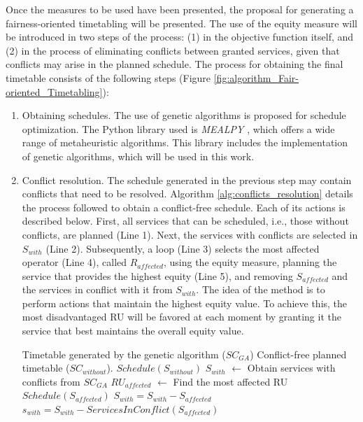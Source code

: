 \documentclass[preprint,12pt]{elsarticle}
\begin{document}
Once the measures to be used have been presented, the proposal for generating a fairness-oriented timetabling will be presented. The use of the equity measure will be introduced in two steps of the process: (1) in the objective function itself, and (2) in the process of eliminating conflicts between granted services, given that conflicts may arise in the planned schedule. The process for obtaining the final timetable consists of the following steps (Figure \ref{fig:algorithm_Fair-oriented_Timetabling}):
\begin{enumerate}


    \item Obtaining schedules. The use of genetic algorithms is proposed \cite{Holland1992} for schedule optimization. The Python library used is \textit{MEALPY} \cite{Vanthieu2023}, which offers a wide range of metaheuristic algorithms. This library includes the implementation of genetic algorithms, which will be used in this work.  
    \item Conflict resolution. The schedule generated in the previous step may contain conflicts that need to be resolved. Algorithm \ref{alg:conflicts_resolution} details the process followed to obtain a conflict-free schedule. Each of its actions is described below. First, all services that can be scheduled, i.e., those without conflicts, are planned (Line 1). Next, the services with conflicts are selected in $S_{with}$ (Line 2). Subsequently, a loop (Line 3) selects the most affected operator (Line 4), called $R_{affected}$, using the equity measure, planning the service that provides the highest equity (Line 5), and removing $S_{affected}$ and the services in conflict with it from $S_{with}$. The idea of the method is to perform actions that maintain the highest equity value. To achieve this, the most disadvantaged RU will be favored at each moment by granting it the service that best maintains the overall equity value.

\begin{algorithm}[!t]
\caption{Resolution of scheduling conflicts returned by the genetic algorithm.}
\label{alg:conflicts_resolution}
\begin{algorithmic}[1]
\REQUIRE Timetable generated by the genetic algorithm ($SC_{GA}$)
\ENSURE Conflict-free planned timetable ($SC_{without}$).
\STATE $Schedule(S_{without})$ 
\STATE $S_{with}$ $\leftarrow$ Obtain services with conflicts from $SC_{GA}$
    \STATE $RU_{affected}$ $\leftarrow$ Find the most affected RU
    \STATE $Schedule(S_{affected})$ 
    \STATE $S_{with} = S_{with} - S_{affected}$ 
    \STATE $s_{with} = S_{with} - ServicesInConflict(S_{affected})$ 
\ENDWHILE
\end{algorithmic}
\end{algorithm}


\end{enumerate}
\end{document}
